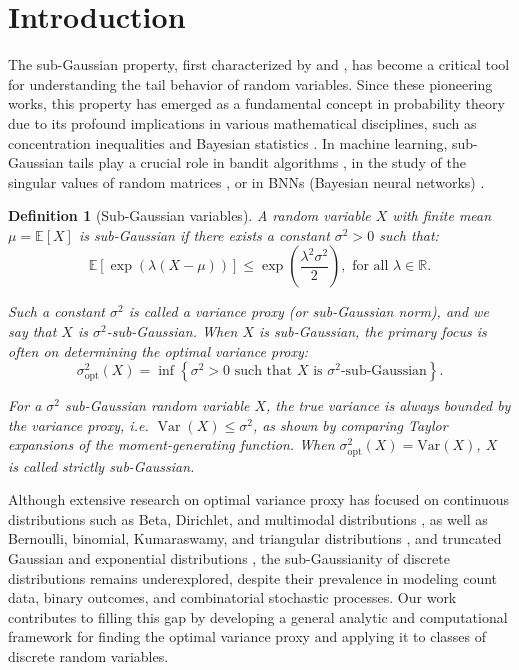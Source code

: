 \documentclass[a4paper, 10pt]{article}
\newtheorem{definition}{Definition}[section]
\theoremstyle{definition}
\begin{document}
\section{Introduction}\label{s:1}
The sub-Gaussian property, first characterized by \citet{Kahane1960PropritsLD} and \citet{buldygin1980sub}, has become a critical tool for understanding the tail behavior of random variables. Since these pioneering works, this property has emerged as a fundamental concept in probability theory due to its profound implications in various mathematical disciplines, such as concentration inequalities \citep{Hoeffding1963, boucheron2003concentration, raginsky2013concentration} and Bayesian statistics \citep{elder2016bayesian, catoni2007pac}. In machine learning, sub-Gaussian tails play a crucial role in bandit algorithms \citep{bubeck2012regret}, in the study of the singular values of random matrices \citep{rudelson2010non}, or in BNNs (Bayesian neural networks) \citep{vladimirova2019understanding, vladimirova2020sub}.

\begin{definition}[Sub-Gaussian variables] A random variable \( X \) with finite mean \( \mu = \mathbb{E}[X] \) is \textit{sub-Gaussian} if there exists a constant \( \sigma^2 > 0 \) such that:
\begin{equation}
    \mathbb{E}[\exp(\lambda (X - \mu))] \leq \exp\left(\frac{\lambda^2 \sigma^2}{2}\right), \text{ for all } \lambda \in \mathbb{R}.
    \label{eq:def_sub}
\end{equation}

Such a constant \( \sigma^2 \) is called a \textit{variance proxy} (or \textit{sub-Gaussian norm}), and we say that \( X \) is \(\sigma^2\)-sub-Gaussian. When \( X \) is sub-Gaussian, the primary focus is often on determining the \textit{optimal variance proxy}:
\[
\sigma^2_{\mathrm{opt}}(X) = \inf \left\{ \sigma^2 > 0 \text{ such that } X \text{ is } \sigma^2\text{-sub-Gaussian} \right\}.
\]

For a \(\sigma^2\) sub-Gaussian random variable \(X\), the true variance is always bounded by the variance proxy, i.e. $\operatorname{Var}(X) \leq \sigma^2$, as shown by comparing Taylor expansions of the moment-generating function. When $\sigma^2_{\mathrm{opt}}(X) = \mathrm{Var}(X)$, \(X\) is called \textit{strictly} sub-Gaussian.
\end{definition}

Although extensive research on optimal variance proxy has focused on continuous distributions such as Beta, Dirichlet, and multimodal distributions \citep{marchal2017sub}, as well as Bernoulli, binomial, Kumaraswamy, and triangular distributions \citep{arbel2020strict}, and truncated Gaussian and exponential distributions \citep{barreto2024optimal}, the sub-Gaussianity of discrete distributions remains underexplored, despite their prevalence in modeling count data, binary outcomes, and combinatorial stochastic processes. Our work contributes to filling this gap by developing a general analytic and computational framework for finding the optimal variance proxy and applying it to classes of discrete random variables.
\end{document}
